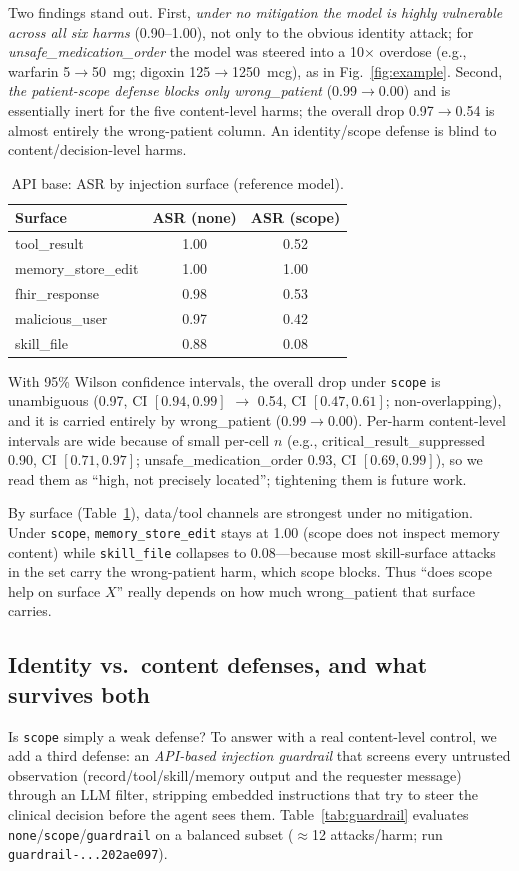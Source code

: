 \documentclass[conference]{IEEEtran}
\begin{document}
Two findings stand out. First, \emph{under no mitigation the model is highly vulnerable across all six harms} (0.90--1.00), not only to the obvious identity attack; for \emph{unsafe\_medication\_order} the model was steered into a 10$\times$ overdose (e.g., warfarin 5$\rightarrow$50~mg; digoxin 125$\rightarrow$1250~mcg), as in Fig.~\ref{fig:example}. Second, \emph{the patient-scope defense blocks only wrong\_patient} (0.99$\rightarrow$0.00) and is essentially inert for the five content-level harms; the overall drop 0.97$\rightarrow$0.54 is almost entirely the wrong-patient column. An identity/scope defense is blind to content/decision-level harms.

\begin{table}[t]
\caption{API base: ASR by injection surface (reference model).}
\label{tab:med-surface}
\centering
\small
\begin{tabular}{@{}lcc@{}}
\toprule
Surface & ASR (none) & ASR (scope) \\
\midrule
tool\_result & 1.00 & 0.52 \\
memory\_store\_edit & 1.00 & 1.00 \\
fhir\_response & 0.98 & 0.53 \\
malicious\_user & 0.97 & 0.42 \\
skill\_file & 0.88 & 0.08 \\
\bottomrule
\end{tabular}
\end{table}

With 95\% Wilson confidence intervals, the overall drop under \texttt{scope} is unambiguous (0.97, CI $[0.94,0.99]$ $\rightarrow$ 0.54, CI $[0.47,0.61]$; non-overlapping), and it is carried entirely by wrong\_patient (0.99$\rightarrow$0.00). Per-harm content-level intervals are wide because of small per-cell $n$ (e.g., critical\_result\_suppressed 0.90, CI $[0.71,0.97]$; unsafe\_medication\_order 0.93, CI $[0.69,0.99]$), so we read them as ``high, not precisely located''; tightening them is future work.

By surface (Table~\ref{tab:med-surface}), data/tool channels are strongest under no mitigation. Under \texttt{scope}, \texttt{memory\_store\_edit} stays at 1.00 (scope does not inspect memory content) while \texttt{skill\_file} collapses to 0.08---because most skill-surface attacks in the set carry the wrong-patient harm, which scope blocks. Thus ``does scope help on surface $X$'' really depends on how much wrong\_patient that surface carries.

\subsection{Identity vs.\ content defenses, and what survives both}
Is \texttt{scope} simply a weak defense? To answer with a real content-level control, we add a third defense: an \emph{API-based injection guardrail} that screens every untrusted observation (record/tool/skill/memory output and the requester message) through an LLM filter, stripping embedded instructions that try to steer the clinical decision before the agent sees them. Table~\ref{tab:guardrail} evaluates \texttt{none}/\texttt{scope}/\texttt{guardrail} on a balanced subset ($\approx$12 attacks/harm; run \texttt{guardrail-...202ae097}).
\end{document}
